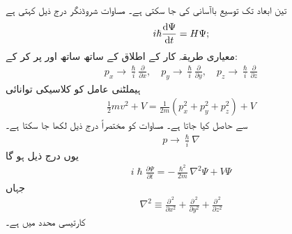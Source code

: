 



تین ابعاد تک توسیع  باآسانی کی جا سکتی ہے۔ مساوات شروڈنگر درج ذیل کہتی ہے
\begin{align}
i\hslash\frac{\dif{\Psi}}{\dif{t}}=H\Psi;
\end{align}
معیاری طریقہ کار کے اطلاق   کے ساتھ ساتھ  اور  پر  کر کے:
\begin{align}\label{مساوات_تین_ابعاد_عاملین_الف}
 p_{x}\to \frac{\hslash}{i}\frac{\partial}{\partial{x}},\quad p_{y}\to \frac{\hslash}{i}\frac{\partial}{\partial{y}},\quad p_{z}\to \frac{\hslash}{i}\frac{\partial}{\partial{z}} 
\end{align}
ہیملٹنی عامل  کو کلاسیکی توانائی
\begin{align*}
\frac{1}{2}mv^{2}+V=\frac{1}{2m}(p_{x}^{2}+p_{y}^{2}+p_{z}^{2})+V
\end{align*}
سے حاصل کیا جاتا ہے۔ مساوات  کو مختصراً درج ذیل لکھا  جا سکتا ہے۔
\begin{align}
p\to \frac{\hslash}{i}\nabla
\end{align}
یوں درج ذیل ہو گا
\begin{align}
i\hslash\frac{\partial{\Psi}}{\partial{t}}=-\frac{\hslash^{2}}{2m}\nabla^{2}\Psi+V\Psi
\end{align}
جہاں
\begin{align}
\nabla^{2}\equiv \frac{\partial^{\,2}}{\partial{x^2}}+\frac{\partial^{\,2}}{\partial{y^2}}+\frac{\partial^{\,2}}{\partial{z^2}} 
\end{align}
کارتیسی محدد میں  ہے۔

